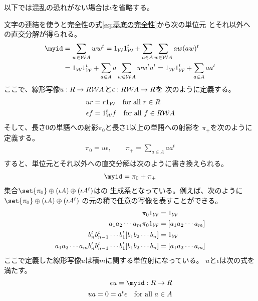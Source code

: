 	以下では混乱の恐れがない場合は$\iota$を省略する。

	文字の連結を使うと完全性の式\eqref{eq:基底の完全性}から次の単位元\wordu{}
	とそれ以外への直交分解が得られる。
	\begin{equation*}\begin{split} %
		\myid &= \sum_{w\in\Word{A}}ww^t
		= \wordu{}\wordu{}^t + \sum_{a\in A}\sum_{w\in\Word{A}}aw(aw)^t \\
		&= \wordu{}\wordu{}^t + \sum_{a\in A}a\sum_{w\in\Word{A}}ww^ta^t
		= \wordu{}\wordu{}^t + \sum_{a\in A}aa^t
	\end{split}\end{equation*} %
	ここで、線形写像$u:R\to R\mathcal{W}{A}$と$\epsilon:R\mathcal{W}{A}\to R$を
	次のように定義する。
	\begin{equation}\label{eq:連結の単位射と余単位射}\begin{split} %
		ur &= r\wordu{} \quad\text{for all }r\in R \\
		\epsilon f &= \wordu{}^tf \quad\text{for all }f\in R\Word{A} \\
	\end{split}\end{equation} %
	そして、長さ$0$の単語への射影$\pi_0$と長さ$1$以上の単語への射影を
	$\pi_+$を次のように定義する。
	\begin{equation}\label{eq:単位元への射影}\begin{split} %
		\pi_0 = u\epsilon,\qquad \pi_+ = \sum_{a\in A}aa^t \\
	\end{split}\end{equation} %
	すると、単位元\wordu{}とそれ以外への直交分解は次のように書き換えられる。
	\begin{equation}\label{eq:文字の連結による完全性}\begin{split} %
		\myid = \pi_0 + \pi_+ \\
	\end{split}\end{equation} %
	集合$\set{\pi_0}\oplus(\iota A)\oplus(\iota A^t)$はの
	生成系となっている。例えば、次のように
	$\set{\pi_0}\oplus(\iota A)\oplus(\iota A^t)$
	の元の積で任意の写像を表すことができる。
	\begin{equation*}\begin{split} %
		\pi_0\wordu{} &= \wordu{} \\
		a_1a_2\cdots a_m\pi_0\wordu{} &= \word{a_1a_2\cdots a_m} \\
		b_n^tb_{n-1}^t\cdots b_1^t\word{b_1b_2\cdots b_n} &= \wordu{} \\
		a_1a_2\cdots a_mb_n^tb_{n-1}^t\cdots b_1^t\word{b_1b_2\cdots b_n}
		&= \word{a_1a_2\cdots a_m} \\
	\end{split}\end{equation*} %
	ここで定義した線形写像$u$は積$m$に関する単位射になっている。
	$u$と$\epsilon$は次の式を満たす。
	\begin{equation*}\begin{split} %
		\epsilon u = \myid: R\to R \\
		ua = 0 = a^t\epsilon \quad\text{for all }a\in A
	\end{split}\end{equation*} %


